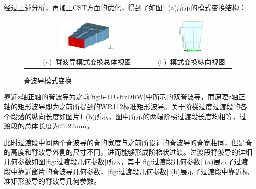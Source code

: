 \documentclass[master]{thesis-uestc}
\begin{document}
经过上述分析，再加上CST方面的优化，得到了如图\ref{fig:脊波导模式变换} (a)所示的模式变换结构：

\begin{figure}[!htb]
    \small
    \centering
    \begin{tabular}{@{\ }c@{\ }c}
        \includegraphics[width=0.45\textwidth]{pic/chapter3/脊波导模式变换.png} & 
        \hspace{5pt}
        \includegraphics[width=0.35\textwidth]{pic/chapter3/模式变换纵向长度.png}     \\
        \mbox{\small (a) 脊波导模式变换总体视图}                                                                               & 
        \mbox{\small (b) 模式变换纵向视图}                                                                                  \\
    \end{tabular}
    \caption{脊波导模式变换}
    \label{fig:脊波导模式变换}
\end{figure}

靠近z轴正轴的脊波导为之前\ref{fig:6-11GHzDRW}中所示的双脊波导，而原理z轴正轴的矩形波导即为之前所提到的WR112标准矩形波导。关于阶梯过度过渡段的各个段落的纵向长度如图片\ref{fig:脊波导模式变换} (b)所示，图中所示的两端阶梯过渡段长度均相等，过渡段的总体长度为21.22mm。

此时过渡段中间两个脊波导的脊的宽度与之前所设计的脊波导的脊宽相同，但是脊的高度和脊波导外侧的尺寸不同，进而能够形成阶梯状过渡。过渡段脊波导的详细几何参数如图\ref{fig:过渡段几何参数}所示，其中\ref{fig:过渡段几何参数} (a)展示了过渡段中靠近窗片的脊波导几何参数，\ref{fig:过渡段几何参数} (b)展示了过渡段中靠近标准矩形波导的脊波导几何参数。
\end{document}
